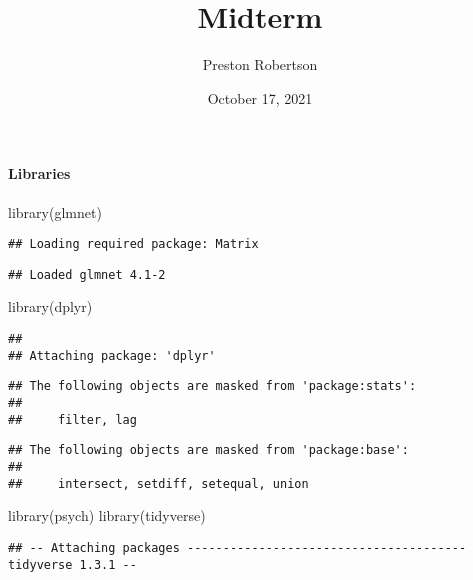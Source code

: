 \documentclass[
]{article}
\title{Midterm}
\author{Preston Robertson}
\date{October 17, 2021}
\newenvironment{Shaded}{\begin{snugshade}}{\end{snugshade}}
\newcommand{\FunctionTok}[1]{\textcolor[rgb]{0.00,0.00,0.00}{#1}}
\newcommand{\NormalTok}[1]{#1}
\begin{document}
\maketitle

\hypertarget{libraries}{%
\paragraph{Libraries}\label{libraries}}

\begin{Shaded}
\begin{Highlighting}[]
\FunctionTok{library}\NormalTok{(glmnet)  }
\end{Highlighting}
\end{Shaded}

\begin{verbatim}
## Loading required package: Matrix
\end{verbatim}

\begin{verbatim}
## Loaded glmnet 4.1-2
\end{verbatim}

\begin{Shaded}
\begin{Highlighting}[]
\FunctionTok{library}\NormalTok{(dplyr)  }
\end{Highlighting}
\end{Shaded}

\begin{verbatim}
## 
## Attaching package: 'dplyr'
\end{verbatim}

\begin{verbatim}
## The following objects are masked from 'package:stats':
## 
##     filter, lag
\end{verbatim}

\begin{verbatim}
## The following objects are masked from 'package:base':
## 
##     intersect, setdiff, setequal, union
\end{verbatim}

\begin{Shaded}
\begin{Highlighting}[]
\FunctionTok{library}\NormalTok{(psych)}
\FunctionTok{library}\NormalTok{(tidyverse)}
\end{Highlighting}
\end{Shaded}

\begin{verbatim}
## -- Attaching packages --------------------------------------- tidyverse 1.3.1 --
\end{verbatim}
\end{document}
